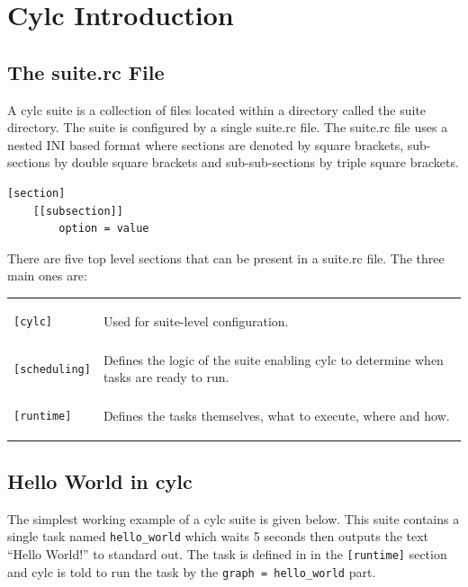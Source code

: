 \section{Cylc Introduction}


\subsection{The suite.rc File}

A cylc suite is a collection of files located within a directory called the
suite directory. The suite is configured by a single suite.rc file.
The suite.rc file uses a nested INI based format where sections are denoted
by square brackets, sub-sections by double square brackets and
sub-sub-sections by triple square brackets.

\begin{lstlisting}[language=suiterc]
[section]
    [[subsection]]
        option = value
\end{lstlisting}

There are five top level sections that can be present in a suite.rc file. The
three main ones are:

\begin{tabular}{ll}
\begin{lstlisting}
[cylc]
\end{lstlisting} & Used for suite-level configuration. \\
\begin{lstlisting}
[scheduling]
\end{lstlisting} & Defines the logic of the suite enabling cylc to determine
when tasks are ready to run. \\
\begin{lstlisting}
[runtime]
\end{lstlisting} & Defines the tasks themselves, what to execute, where and
how. \\
\end{tabular}


\subsection{Hello World in cylc}

The simplest working example of a cylc suite is given below. This suite
contains a single task named \lstinline{hello_world} which waits 5 seconds
then outputs the text ``Hello World!'' to standard out. The task is defined in
in the \lstinline=[runtime]= section and cylc is told to run the task by the
\lstinline{graph = hello_world} part.

